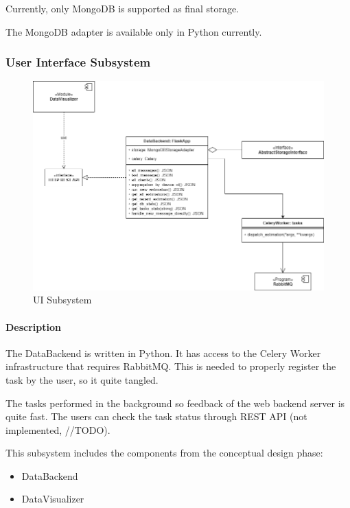 Currently, only MongoDB is supported as final storage.

The MongoDB adapter is available only in Python currently.

\hypertarget{user-interface-subsystem}{%
\subsubsection{User Interface
Subsystem}\label{user-interface-subsystem}}

\begin{figure}
\centering
\includegraphics{schemes/classes/ClassDiagram-ui_subsystem.png}
\caption{UI Subsystem}
\end{figure}

\hypertarget{description-2}{%
\paragraph{Description}\label{description-2}}

The DataBackend is written in Python. It has access to the Celery Worker
infrastructure that requires RabbitMQ. This is needed to properly
register the task by the user, so it quite tangled.

The tasks performed in the background so feedback of the web backend
server is quite fast. The users can check the task status through REST
API (not implemented, //TODO).

This subsystem includes the components from the conceptual design phase:

\begin{itemize}
\tightlist
\item
  DataBackend
\item
  DataVisualizer
\end{itemize}

